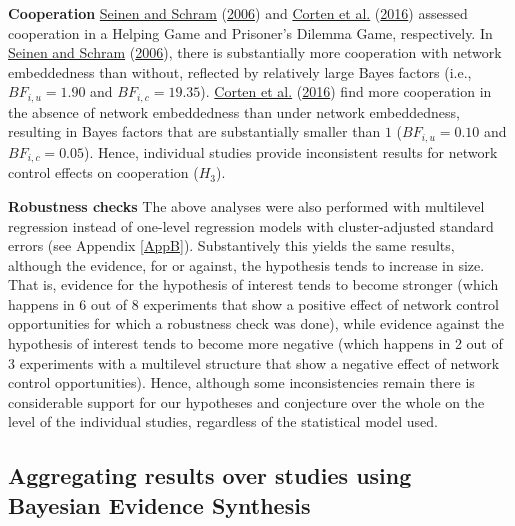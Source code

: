 \documentclass[
  11pt,
]{article}
\begin{document}
\textbf{Cooperation} \hspace{8pt} \protect\hyperlink{ref-seinen_schram_social_2006}{Seinen and Schram} (\protect\hyperlink{ref-seinen_schram_social_2006}{2006}) and \protect\hyperlink{ref-corten_etal_reputation_2016}{Corten et al.} (\protect\hyperlink{ref-corten_etal_reputation_2016}{2016}) assessed cooperation in a Helping Game and Prisoner's Dilemma Game, respectively.
In \protect\hyperlink{ref-seinen_schram_social_2006}{Seinen and Schram} (\protect\hyperlink{ref-seinen_schram_social_2006}{2006}), there is substantially more cooperation with network embeddedness than without, reflected by relatively large Bayes factors (i.e., \(BF_{i,u} = 1.90\) and \(BF_{i,c} = 19.35\)).
\protect\hyperlink{ref-corten_etal_reputation_2016}{Corten et al.} (\protect\hyperlink{ref-corten_etal_reputation_2016}{2016}) find more cooperation in the absence of network embeddedness than under network embeddedness, resulting in Bayes factors that are substantially smaller than \(1\) (\(BF_{i,u} = 0.10\) and \(BF_{i,c} = 0.05\)).
Hence, individual studies provide inconsistent results for network control effects on cooperation (\(H_3\)).

\textbf{Robustness checks} \hspace{8pt} The above analyses were also performed with multilevel regression instead of one-level regression models with cluster-adjusted standard errors (see Appendix \ref{AppB}).
Substantively this yields the same results, although the evidence, for or against, the hypothesis tends to increase in size.
That is, evidence for the hypothesis of interest tends to become stronger (which happens in 6 out of 8 experiments that show a positive effect of network control opportunities for which a robustness check was done), while evidence against the hypothesis of interest tends to become more negative (which happens in 2 out of 3 experiments with a multilevel structure that show a negative effect of network control opportunities).
Hence, although some inconsistencies remain there is considerable support for our hypotheses and conjecture over the whole on the level of the individual studies, regardless of the statistical model used.

\hypertarget{aggregating-results-over-studies-using-bayesian-evidence-synthesis}{%
\subsection{Aggregating results over studies using Bayesian Evidence Synthesis}\label{aggregating-results-over-studies-using-bayesian-evidence-synthesis}}
\end{document}
